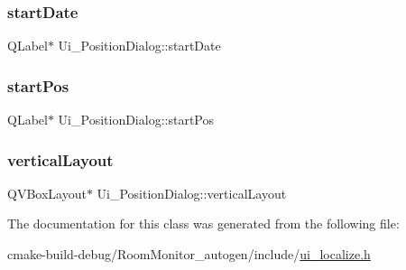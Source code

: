 \subsubsection{\texorpdfstring{start\+Date}{startDate}}
{\footnotesize\ttfamily Q\+Label$\ast$ Ui\+\_\+\+Position\+Dialog\+::start\+Date}

\mbox{\label{class_ui___position_dialog_af87caa4a33b98ff46484b96d1edbabed}} 
\subsubsection{\texorpdfstring{start\+Pos}{startPos}}
{\footnotesize\ttfamily Q\+Label$\ast$ Ui\+\_\+\+Position\+Dialog\+::start\+Pos}

\mbox{\label{class_ui___position_dialog_a71ea0f4d2fc6f6ab2ebf962f790dfe28}} 
\subsubsection{\texorpdfstring{vertical\+Layout}{verticalLayout}}
{\footnotesize\ttfamily Q\+V\+Box\+Layout$\ast$ Ui\+\_\+\+Position\+Dialog\+::vertical\+Layout}



The documentation for this class was generated from the following file\+:\begin{DoxyCompactItemize}
\item 
cmake-\/build-\/debug/\+Room\+Monitor\+\_\+autogen/include/\hyperlink{ui__localize_8h}{ui\+\_\+localize.\+h}\end{DoxyCompactItemize}
